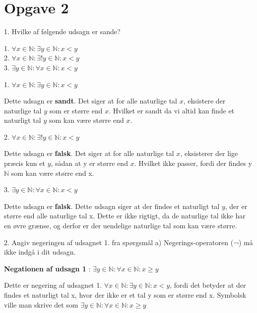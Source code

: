 \section{Opgave 2}

1. Hvilke af følgende udsagn er sande?

\begin{center}
    1. $\forall x \in \mathbb{N}: \exists y \in \mathbb{N}: x<y$
\\
    2. $\forall x \in \mathbb{N}: \exists ! y \in \mathbb{N}: x<y$
\\
    3. $\exists y \in \mathbb{N}: \forall x \in \mathbb{N}: x<y$
    
\end{center}

1. $\forall x \in \mathbb{N}: \exists y \in \mathbb{N}: x<y$

Dette udsagn er \textbf{sandt}. Det siger at for alle naturlige tal $x$, eksistere der naturlige tal $y$ som er større end $x$. Hvilket er sandt da vi altid kan finde et naturligt tal $y$ som kan være større end $x$.

2. $\forall x \in \mathbb{N}: \exists ! y \in \mathbb{N}: x<y$

Dette udsagn er \textbf{falsk}. Det siger at for alle naturlige tal $x$, eksisterer der lige præcis kun et $y$, sådan at y er større end $x$. Hvilket ikke passer, fordi der findes y $\mathbb{N}$ som kan være større end x. 

3. $\exists y \in \mathbb{N}: \forall x \in \mathbb{N}: x<y$

Dette udsagn er \textbf{falsk}. Dette udsagn siger at der findes et naturligt tal $y$, der er større end alle naturlige tal x. Dette er ikke rigtigt, da de naturlige tal ikke har en øvre grænse, og derfor er der uendelige naturlige tal som kan være større. 

2. Angiv negeringen af udsagnet 1. fra spørgsmål a) Negerings-operatoren (¬) må ikke indgå i dit udsagn.
\\

\begin{center}
    \textbf{Negationen af udsagn 1}  : $\exists y \in \mathbb{N}: \forall x \in \mathbb{N}: x \geq y$

\end{center}

Dette er negering af udsagnet 1. $\forall x \in \mathbb{N}: \exists y \in \mathbb{N}: x<y$, fordi det betyder at der findes et naturligt tal x, hvor der ikke er et tal y som er større end x. Symbolsk ville man skrive det som $\exists y \in \mathbb{N}: \forall x \in \mathbb{N}: x \geq y$